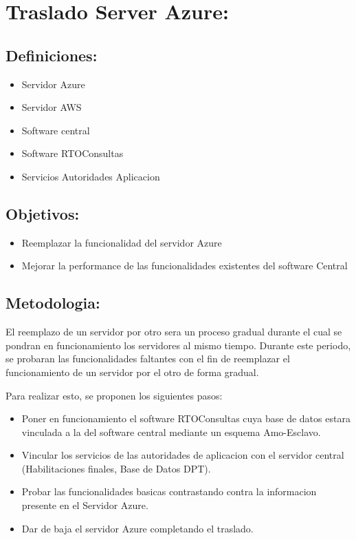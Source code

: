 \documentclass[11pt]{article}
\author{Enrique Loeser}
\date{\today}
\title{}
\begin{document}
\tableofcontents

\section{Traslado Server Azure:}
\label{sec:org26fb3cb}

\subsection{Definiciones:}
\label{sec:org5d6b9b1}
\begin{itemize}
\item Servidor Azure
\item Servidor AWS
\item Software central
\item Software RTOConsultas
\item Servicios Autoridades Aplicacion
\end{itemize}

\subsection{Objetivos:}
\label{sec:org3921e5f}
\begin{itemize}
\item Reemplazar la funcionalidad del servidor Azure
\item Mejorar la performance de las funcionalidades existentes del software Central
\end{itemize}

\subsection{Metodologia:}
\label{sec:org8f17102}
El reemplazo de un servidor por otro sera un proceso gradual durante el cual se pondran en funcionamiento los servidores al mismo tiempo. Durante este periodo, se probaran las funcionalidades faltantes con el fin de reemplazar el funcionamiento de un servidor por el otro de forma gradual.

Para realizar esto, se proponen los siguientes pasos:
\begin{itemize}
\item Poner en funcionamiento el software RTOConsultas cuya base de datos estara vinculada a la del software central mediante un esquema Amo-Esclavo.
\item Vincular los servicios de las autoridades de aplicacion con el servidor central (Habilitaciones finales, Base de Datos DPT).
\item Probar las funcionalidades basicas contrastando contra la informacion presente en el Servidor Azure.
\item Dar de baja el servidor Azure completando el traslado.
\end{itemize}
\end{document}
